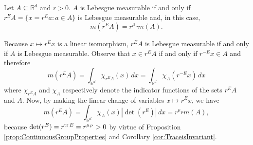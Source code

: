 \documentclass[smallextended]{svjour3}
\theoremstyle{remark}
\renewenvironment{proof}[1][\proofname]{\renewcommand\xproofname{#1}\xproof}{\endxproof}
\renewcommand\det{\operatorname{det}}
\begin{document}
\begin{lemma}\label{lemma:Scaling}
Let $A\subseteq\mathbb{R}^d$ and $r>0$.  $A$ is Lebesgue measurable if and only if $r^E A=\{x=r^E a:a\in A\}$ is Lebesgue measurable and, in this case,
\begin{equation*}
m(r^E A)=r^{\mu_P}m(A).
\end{equation*}
\end{lemma}

\begin{proof}
Because $x\mapsto r^E x$ is a linear isomorphism, $r^E A$ is Lebesgue measurable if and only if $A$ is Lebesgue measurable. Observe that $x\in r^E A$ if and only if $r^{-E}x\in A$ and therefore
\begin{equation*}
m(r^E A)=\int_{\mathbb{R}^d}\chi_{r^E A}(x)\,dx=\int_{\mathbb{R}^d}\chi_{A}(r^{-E}x)\,dx
\end{equation*}
where $\chi_{r^EA}$ and $\chi_{A}$ respectively denote the indicator functions of the sets $r^EA$ and $A$. Now, by making the linear change of variables $x\mapsto r^E x$, we have
\begin{equation*}
m(r^E A)=\int_{\mathbb{R}^d}\chi_A(x)|\det(r^E)|\,dx=r^{\mu_P}m(A),
\end{equation*}
because $\det(r^E)=r^{\tr E}=r^{\mu_P}>0$ by virtue of Proposition \ref{prop:ContinuousGroupProperties} and Corollary \ref{cor:TraceisInvariant}.
\end{proof}
\end{document}
